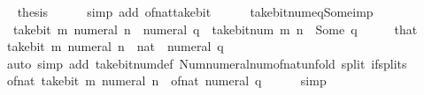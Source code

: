 \begin{isabellebody}
\ \isamarkupfalse%
\ {\isacharquery}{\kern0pt}thesis\isanewline
\ \ \ \ \isamarkupfalse%
\ {\isacharparenleft}{\kern0pt}simp\ add{\isacharcolon}{\kern0pt}\ of{\isacharunderscore}{\kern0pt}nat{\isacharunderscore}{\kern0pt}take{\isacharunderscore}{\kern0pt}bit{\isacharparenright}{\kern0pt}\isanewline
{}\isamarkupfalse%
%
\endisatagproof
{\isafoldproof}%
%
\isadelimproof
\isanewline
%
\endisadelimproof
\ \ \ \ \isanewline
{}\isamarkupfalse%
\ take{\isacharunderscore}{\kern0pt}bit{\isacharunderscore}{\kern0pt}num{\isacharunderscore}{\kern0pt}eq{\isacharunderscore}{\kern0pt}Some{\isacharunderscore}{\kern0pt}imp{\isacharcolon}{\kern0pt}\isanewline
\ \ {\isacartoucheopen}take{\isacharunderscore}{\kern0pt}bit\ m\ {\isacharparenleft}{\kern0pt}numeral\ n{\isacharparenright}{\kern0pt}\ {\isacharequal}{\kern0pt}\ numeral\ q{\isacartoucheclose}\ \ {\isacartoucheopen}take{\isacharunderscore}{\kern0pt}bit{\isacharunderscore}{\kern0pt}num\ m\ n\ {\isacharequal}{\kern0pt}\ Some\ q{\isacartoucheclose}\isanewline
%
\isadelimproof
%
\endisadelimproof
%
\isatagproof
{}\isamarkupfalse%
\ {\isacharminus}{\kern0pt}\isanewline
\ \ \isamarkupfalse%
\ that\ \isamarkupfalse%
\ {\isacartoucheopen}take{\isacharunderscore}{\kern0pt}bit\ m\ {\isacharparenleft}{\kern0pt}numeral\ n\ {\isacharcolon}{\kern0pt}{\isacharcolon}{\kern0pt}\ nat{\isacharparenright}{\kern0pt}\ {\isacharequal}{\kern0pt}\ numeral\ q{\isacartoucheclose}\isanewline
\ \ \ \ \isamarkupfalse%
\ {\isacharparenleft}{\kern0pt}auto\ simp\ add{\isacharcolon}{\kern0pt}\ take{\isacharunderscore}{\kern0pt}bit{\isacharunderscore}{\kern0pt}num{\isacharunderscore}{\kern0pt}def\ Num{\isachardot}{\kern0pt}numeral{\isacharunderscore}{\kern0pt}num{\isacharunderscore}{\kern0pt}of{\isacharunderscore}{\kern0pt}nat{\isacharunderscore}{\kern0pt}unfold\ split{\isacharcolon}{\kern0pt}\ if{\isacharunderscore}{\kern0pt}splits{\isacharparenright}{\kern0pt}\isanewline
\ \ \isamarkupfalse%
\ \isamarkupfalse%
\ {\isacartoucheopen}of{\isacharunderscore}{\kern0pt}nat\ {\isacharparenleft}{\kern0pt}take{\isacharunderscore}{\kern0pt}bit\ m\ {\isacharparenleft}{\kern0pt}numeral\ n{\isacharparenright}{\kern0pt}{\isacharparenright}{\kern0pt}\ {\isacharequal}{\kern0pt}\ of{\isacharunderscore}{\kern0pt}nat\ {\isacharparenleft}{\kern0pt}numeral\ q{\isacharparenright}{\kern0pt}{\isacartoucheclose}\isanewline
\ \ \ \ \isamarkupfalse%
\ simp\isanewline
\ \ \isamarkupfalse%

\end{isabellebody}
